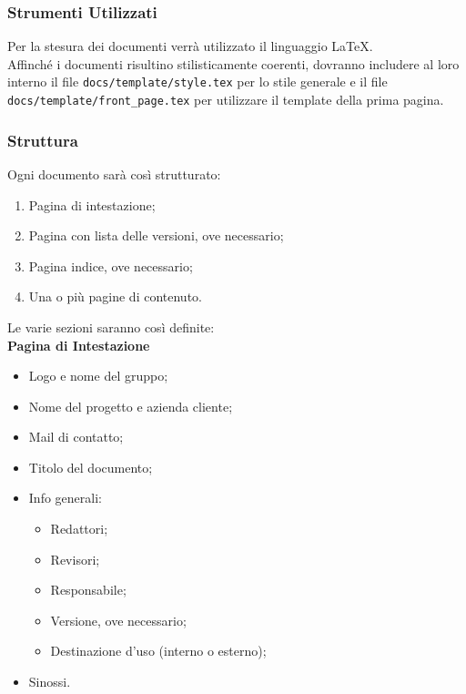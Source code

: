\documentclass[a4paper, 12pt]{article}
\begin{document}
\subsubsection{Strumenti Utilizzati}
Per la stesura dei documenti verrà utilizzato il linguaggio \LaTeX. \\
Affinché i documenti risultino stilisticamente coerenti, dovranno includere al loro interno il file \texttt{docs/template/style.tex} per lo stile generale e il file \texttt{docs/template/front\_page.tex} per utilizzare il template della prima pagina.

\subsubsection{Struttura}
Ogni documento sarà così strutturato:
\begin{enumerate}
    \item Pagina di intestazione;
    \item Pagina con lista delle versioni, ove necessario;
    \item Pagina indice, ove necessario;
    \item Una o più pagine di contenuto.
\end{enumerate}

Le varie sezioni saranno così definite: \\

\textbf{Pagina di Intestazione} 
\begin{itemize}
    \item Logo e nome del gruppo;
    \item Nome del progetto e azienda cliente;
    \item Mail di contatto;
    \item Titolo del documento;
    \item Info generali:
    \begin{itemize}
        \item Redattori;
        \item Revisori;
        \item Responsabile;
        \item Versione, ove necessario;
        \item Destinazione d'uso (interno o esterno);
    \end{itemize}
    \item Sinossi.
\end{itemize}
\end{document}
